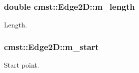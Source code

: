\subsubsection[{\texorpdfstring{m\+\_\+length}{m_length}}]{\setlength{\rightskip}{0pt plus 5cm}double cmst\+::\+Edge2\+D\+::m\+\_\+length\hspace{0.3cm}{\ttfamily [private]}}\hypertarget{classcmst_1_1_edge2_d_ab461fb636aa7f76af613c63c681c186e}{}\label{classcmst_1_1_edge2_d_ab461fb636aa7f76af613c63c681c186e}


Length. 

\subsubsection[{\texorpdfstring{m\+\_\+start}{m_start}}]{ cmst\+::\+Edge2\+D\+::m\+\_\+start\hspace{0.3cm}{\ttfamily [private]}}\hypertarget{classcmst_1_1_edge2_d_a8c0ca77824a84a48c714aaec5da72ad7}{}\label{classcmst_1_1_edge2_d_a8c0ca77824a84a48c714aaec5da72ad7}


Start point. 

